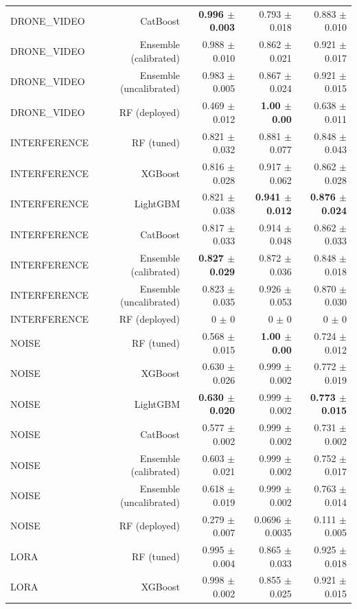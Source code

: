 \begin{table}[htbp]
\begin{tabular}{lrrrr}
DRONE\_VIDEO & CatBoost & \textbf{0.996 $\pm$ 0.003} & 0.793 $\pm$ 0.018 & 0.883 $\pm$ 0.010 \\
DRONE\_VIDEO & Ensemble (calibrated) & 0.988 $\pm$ 0.010 & 0.862 $\pm$ 0.021 & 0.921 $\pm$ 0.017 \\
DRONE\_VIDEO & Ensemble (uncalibrated) & 0.983 $\pm$ 0.005 & 0.867 $\pm$ 0.024 & 0.921 $\pm$ 0.015 \\
DRONE\_VIDEO & RF (deployed) & 0.469 $\pm$ 0.012 & \textbf{1.00 $\pm$ 0.00} & 0.638 $\pm$ 0.011 \\
INTERFERENCE & RF (tuned) & 0.821 $\pm$ 0.032 & 0.881 $\pm$ 0.077 & 0.848 $\pm$ 0.043 \\
INTERFERENCE & XGBoost & 0.816 $\pm$ 0.028 & 0.917 $\pm$ 0.062 & 0.862 $\pm$ 0.028 \\
INTERFERENCE & LightGBM & 0.821 $\pm$ 0.038 & \textbf{0.941 $\pm$ 0.012} & \textbf{0.876 $\pm$ 0.024} \\
INTERFERENCE & CatBoost & 0.817 $\pm$ 0.033 & 0.914 $\pm$ 0.048 & 0.862 $\pm$ 0.033 \\
INTERFERENCE & Ensemble (calibrated) & \textbf{0.827 $\pm$ 0.029} & 0.872 $\pm$ 0.036 & 0.848 $\pm$ 0.018 \\
INTERFERENCE & Ensemble (uncalibrated) & 0.823 $\pm$ 0.035 & 0.926 $\pm$ 0.053 & 0.870 $\pm$ 0.030 \\
INTERFERENCE & RF (deployed) & 0 $\pm$ 0 & 0 $\pm$ 0 & 0 $\pm$ 0 \\
NOISE & RF (tuned) & 0.568 $\pm$ 0.015 & \textbf{1.00 $\pm$ 0.00} & 0.724 $\pm$ 0.012 \\
NOISE & XGBoost & 0.630 $\pm$ 0.026 & 0.999 $\pm$ 0.002 & 0.772 $\pm$ 0.019 \\
NOISE & LightGBM & \textbf{0.630 $\pm$ 0.020} & 0.999 $\pm$ 0.002 & \textbf{0.773 $\pm$ 0.015} \\
NOISE & CatBoost & 0.577 $\pm$ 0.002 & 0.999 $\pm$ 0.002 & 0.731 $\pm$ 0.002 \\
NOISE & Ensemble (calibrated) & 0.603 $\pm$ 0.021 & 0.999 $\pm$ 0.002 & 0.752 $\pm$ 0.017 \\
NOISE & Ensemble (uncalibrated) & 0.618 $\pm$ 0.019 & 0.999 $\pm$ 0.002 & 0.763 $\pm$ 0.014 \\
NOISE & RF (deployed) & 0.279 $\pm$ 0.007 & 0.0696 $\pm$ 0.0035 & 0.111 $\pm$ 0.005 \\
LORA & RF (tuned) & 0.995 $\pm$ 0.004 & 0.865 $\pm$ 0.033 & 0.925 $\pm$ 0.018 \\
LORA & XGBoost & 0.998 $\pm$ 0.002 & 0.855 $\pm$ 0.025 & 0.921 $\pm$ 0.015 \\

\end{tabular}
\end{table}
